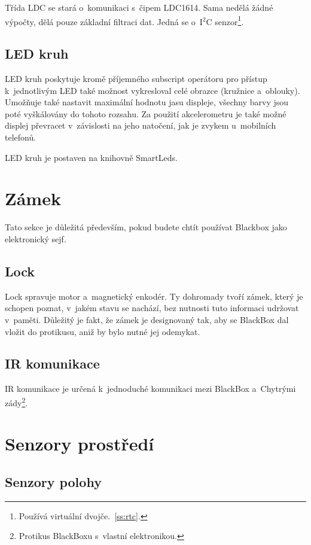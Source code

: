 Třída LDC se stará o~komunikaci s~čipem LDC1614.
Sama nedělá žádné výpočty, dělá pouze základní filtraci dat.
Jedná se o~I$^2$C senzor\footnote{Používá virtuální dvojče.~\autoref{ss:rtc}.}.

\subsection{LED kruh}

LED kruh poskytuje kromě příjemného subscript operátoru pro přístup k~jednotlivým LED také možnost vykresloval celé obrazce (kružnice a~oblouky).
Umožňuje také nastavit maximální hodnotu jasu displeje, všechny barvy jsou poté vyškálovány do tohoto rozsahu.
Za použití akcelerometru je také možné displej převracet v~závislosti na jeho natočení, jak je zvykem u~mobilních telefonů.

LED kruh je postaven na knihovně SmartLeds\cite{SmartLeds}.

\section{Zámek}

Tato sekce je důležitá především, pokud budete chtít používat Blackbox jako elektronický sejf.

\subsection{Lock}

Lock spravuje motor a~magnetický enkodér.
Ty dohromady tvoří zámek, který je schopen poznat, v~jakém stavu se nachází, bez nutnosti tuto informaci udržovat v~paměti.
Důležitý je fakt, že zámek je designovaný tak, aby se BlackBox dal vložit do protikusu, aniž by bylo nutné jej odemykat.

\subsection{IR komunikace}

IR komunikace je určená k~jednoduché komunikaci mezi BlackBox a~Chytrými zády\footnote{Protikus BlackBoxu s~vlastní elektronikou.}.


\section{Senzory prostředí}

\subsection{Senzory polohy}

